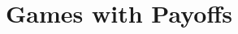 \documentclass[graybox,envcountchap]{svmono}
\begin{document}

\chapter{Games with Payoffs}
\label{4-chap:payoffs}




\end{document}
